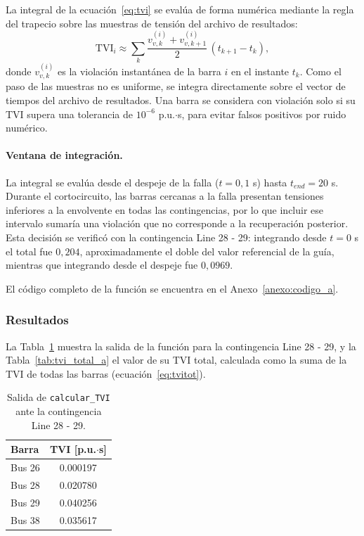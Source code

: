 La integral de la ecuación~\eqref{eq:tvi} se evalúa de forma numérica mediante la regla del trapecio sobre las muestras de tensión del archivo de resultados:
\begin{equation}
    \mathrm{TVI}_i \approx \sum_{k} \frac{v_{v,k}^{(i)} + v_{v,k+1}^{(i)}}{2}\,\left(t_{k+1} - t_k\right),
\end{equation}
donde $v_{v,k}^{(i)}$ es la violación instantánea de la barra $i$ en el instante $t_k$. Como el paso de las muestras no es uniforme, se integra directamente sobre el vector de tiempos del archivo de resultados. Una barra se considera con violación solo si su TVI supera una tolerancia de $10^{-6}$ p.u.$\cdot$s, para evitar falsos positivos por ruido numérico.

\paragraph{Ventana de integración.}
La integral se evalúa desde el despeje de la falla ($t = 0{,}1$ s) hasta $t_{end} = 20$ s. Durante el cortocircuito, las barras cercanas a la falla presentan tensiones inferiores a la envolvente en todas las contingencias, por lo que incluir ese intervalo sumaría una violación que no corresponde a la recuperación posterior. Esta decisión se verificó con la contingencia Line 28 - 29: integrando desde $t = 0$ s el total fue $0{,}204$, aproximadamente el doble del valor referencial de la guía, mientras que integrando desde el despeje fue $0{,}0969$.

El código completo de la función se encuentra en el Anexo~\ref{anexo:codigo_a}.

\subsubsection{Resultados}

La Tabla~\ref{tab:salida_a} muestra la salida de la función para la contingencia Line 28 - 29, y la Tabla~\ref{tab:tvi_total_a} el valor de su TVI total, calculada como la suma de la TVI de todas las barras (ecuación~\eqref{eq:tvitot}).

\begin{table}[H]
    \centering
    \caption{Salida de \texttt{calcular\_TVI} ante la contingencia Line 28 - 29.}
    \label{tab:salida_a}
    \begin{tabular}{|l|c|}
        \hline
        Barra & TVI [p.u.$\cdot$s] \\
        \hline
        Bus 26 & 0.000197 \\
        \hline
        Bus 28 & 0.020780 \\
        \hline
        Bus 29 & 0.040256 \\
        \hline
        Bus 38 & 0.035617 \\
        \hline
    \end{tabular}
\end{table}

